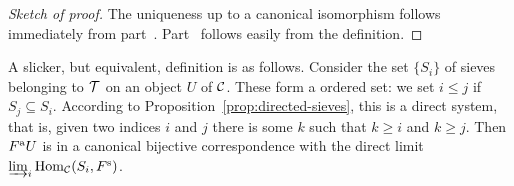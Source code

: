 \begin{2   CONTRAVARIANT FUNCTORS}
\begin{2.3 Sheaves in Grothendieck topologies}
\begin{proof}[Sketch of proof]
The uniqueness up to a canonical isomorphism follows immediately from part~. Part~ follows easily from the definition.
\end{proof}


A slicker, but equivalent, definition is as follows. Consider the set $\{S_{i}\}$ of sieves belonging to $\mathcal{T}$ on an object $U$ of $\mathcal{C}$. These form a ordered set: we set $i \leq j$ if $S_{j} \subseteq S_{i}$. According to Proposition~\ref{prop:directed-sieves}, this is a direct system, that is, given two indices $i$ and $j$ there is some $k$ such that $k \geq i$ and $k \geq j$. Then $F^\mathrm{a} U$ is in a canonical bijective correspondence with the direct limit $\varinjlim_{i}\operatorname{Hom}_{\mathcal{C}}(S_{i}, F^\mathrm{s})$. 



\end{2.3 Sheaves in Grothendieck topologies}
\end{2   CONTRAVARIANT FUNCTORS}
